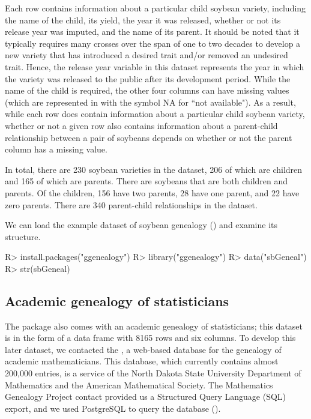 \documentclass[article,shortnames]{jss}
\begin{document}
Each row contains information about a particular child soybean variety, including the name of the child, its yield, the year it was released, whether or not its release year was imputed, and the name of its parent. It should be noted that it typically requires many crosses over the span of one to two decades to develop a new variety that has introduced a desired trait and/or removed an undesired trait. Hence, the release year variable in this dataset represents the year in which the variety was released to the public after its development period. While the name of the child is required, the other four columns can have missing values (which are represented in  with the symbol NA for ``not available"). As a result, while each row does contain information about a particular child soybean variety, whether or not a given row also contains information about a parent-child relationship between a pair of soybeans depends on whether or not the parent column has a missing value.

In total, there are 230 soybean varieties in the dataset, 206 of which are children and 165 of which are parents. There are soybeans that are both children and parents. Of the children, 156 have two parents, 28 have one parent, and 22 have zero parents. There are 340 parent-child relationships in the dataset.

We can load the example dataset of soybean genealogy () and examine its structure.

\begin{CodeChunk}
\begin{CodeInput}
R> install.packages("ggenealogy")
R> library("ggenealogy")
R> data("sbGeneal")
R> str(sbGeneal)
\end{CodeInput}
\end{CodeChunk}

\subsection{Academic genealogy of statisticians}
The  package also comes with an academic genealogy of statisticians; this dataset is in the form of a data frame with 8165 rows and six columns. To develop this later dataset, we contacted the \citealt{mgp}, a web-based database for the genealogy of academic mathematicians. This database, which currently contains almost 200,000 entries, is a service of the North Dakota State University Department of Mathematics and the American Mathematical Society. The Mathematics Genealogy Project contact provided us a Structured Query Language (SQL) export, and we used PostgreSQL to query the database (\citealt{psql}).
\end{document}
